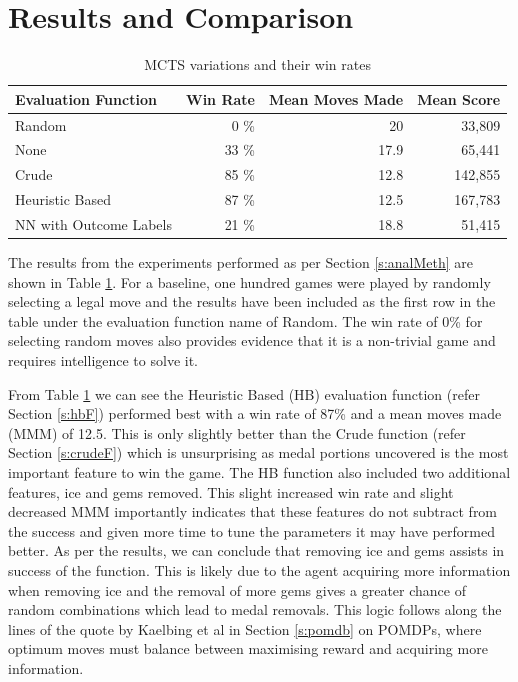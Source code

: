 \documentclass{bhamthesis}
\theoremstyle{definition}
\begin{document}
\section{Results and Comparison}\label{s:resultsC}

\begin{table}[]
	\centering
	\caption{MCTS variations and their win rates}
	\label{t:MCTSWinRates}
	\begin{tabular}{lrrr}
		\hline
		Evaluation Function    & Win Rate & Mean Moves Made & Mean Score \\ \hline
		Random                 & 0 \%     & 20              & 33,809     \\
		None                   & 33 \%    & 17.9            & 65,441     \\
		Crude                  & 85 \%    & 12.8            & 142,855    \\
		Heuristic Based        & 87 \%    & 12.5            & 167,783    \\
		NN with Outcome Labels & 21 \%    & 18.8            & 51,415    
	\end{tabular}
\end{table}

The results from the experiments performed as per Section \ref{s:analMeth} are shown in Table \ref{t:MCTSWinRates}. For a baseline, one hundred games were played by randomly selecting a legal move and the results have been included as the first row in the table under the evaluation function name of Random. The win rate of 0\% for selecting random moves also provides evidence that it is a non-trivial game and requires intelligence to solve it.

From Table \ref{t:MCTSWinRates} we can see the Heuristic Based (HB) evaluation function (refer Section \ref{s:hbF}) performed best with a win rate of 87\% and a mean moves made (MMM) of 12.5. This is only slightly better than the Crude function (refer Section \ref{s:crudeF}) which is unsurprising as medal portions uncovered is the most important feature to win the game. The HB function also included two additional features, ice and gems removed. This slight increased win rate and slight decreased MMM importantly indicates that these features do not subtract from the success and given more time to tune the parameters it may have performed better. As per the results, we can conclude that removing ice and gems assists in success of the function. This is likely due to the agent acquiring more information when removing ice and the removal of more gems gives a greater chance of random combinations which lead to medal removals. This logic follows along the lines of the quote by Kaelbing et al in Section \ref{s:pomdb} on POMDPs, where optimum moves must balance between maximising reward and acquiring more information.
\end{document}
